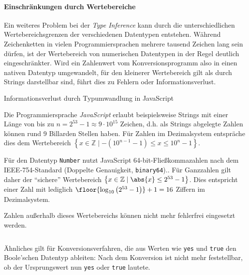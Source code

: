 \paragraph{Einschränkungen durch Wertebereiche}

Ein weiteres Problem bei der \emph{Type Inference} kann durch die unterschiedlichen Wertebereichsgrenzen der verschiedenen Datentypen entstehen.  Während Zeichenketten in vielen Programmiersprachen mehrere tausend Zeichen lang sein dürfen, ist der Wertebereich von numerischen Datentypen in der Regel deutlich eingeschränkter. Wird ein Zahlenwert vom Konversionsprogramm also in einen nativen Datentyp umgewandelt, für den kleinerer Wertebereich gilt als durch Strings darstellbar sind, führt dies zu Fehlern oder Informationsverlust.

\begin{example} Informationsverlust durch Typumwandlung in JavaScript

    Die Programmiersprache \emph{JavaScript} erlaubt beispielsweise Strings mit einer Länge von bis zu $n=2^{53}-1 \approx 9 \cdot 10^{15}$ Zeichen, d.h. als Strings abgelegte Zahlen können rund 9 Billarden Stellen haben.\cite[Abschnitt 6.1.4]{ecma262} Für Zahlen im Dezimalsystem entspräche dies dem Wertebereich $\left\{x \in \mathbb{Z} \mid -\left(10^{n-1}-1\right) \leq x \leq 10^{n}-1\right\}$.

    Für den Datentyp \texttt{Number} nutzt JavaScript 64-bit-Fließkommazahlen nach dem IEEE-754-Standard (Doppelte Genauigkeit, \texttt{binary64}).\cite[Abschnitt 4.3.20]{ecma262}. Für Ganzzahlen gilt daher der \enquote{sichere} Wertebereich $\left\{x \in \mathbb{Z} \mid \abs{x} \leq 2^{53}-1\right\}$\cite[Abschnitt 20.1.2.5]{ecma262}. Dies entspricht einer Zahl mit lediglich $\floor{\log_{10}\left(2^{53}-1\right)}+1 = 16$ Ziffern im Dezimalsystem.

Zahlen außerhalb dieses Wertebereichs können nicht mehr fehlerfrei eingesetzt werden.

    \inputminted[firstline=2,firstnumber=1,mathescape]{javascript}{typeinference.js}
\end{example}

Ähnliches gilt für Konversionsverfahren, die aus Werten wie \texttt{yes} und \texttt{true} den Boole'schen Datentyp ableiten: Nach dem Konversion ist nicht mehr feststellbar, ob der Ursprungswert nun \texttt{yes} oder \texttt{true} lautete.

